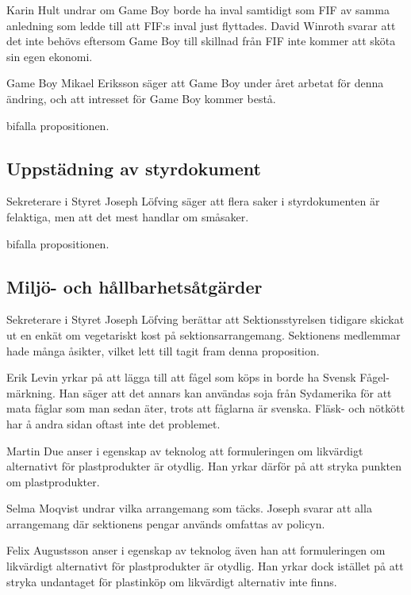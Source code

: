 \documentclass[hidelinks]{sektionsmote}
\begin{document}
Karin Hult undrar om Game Boy borde ha inval samtidigt som FIF av samma anledning som ledde till att FIF:s inval just flyttades.
David Winroth svarar att det inte behövs eftersom Game Boy till skillnad från FIF inte kommer att sköta sin egen ekonomi.

Game Boy Mikael Eriksson säger att Game Boy under året arbetat för denna ändring, och att intresset för Game Boy kommer bestå.

\begin{beslut}
  \item bifalla propositionen.
\end{beslut}


\subsection{Uppstädning av styrdokument}
Sekreterare i Styret Joseph Löfving säger att flera saker i styrdokumenten är felaktiga, men att det mest handlar om småsaker.

\begin{beslut}
  \item bifalla propositionen.
\end{beslut}


\subsection{Miljö- och hållbarhetsåtgärder}
Sekreterare i Styret Joseph Löfving berättar att Sektionsstyrelsen tidigare skickat ut en enkät om vegetariskt kost på sektionsarrangemang.
Sektionens medlemmar hade många åsikter, vilket lett till tagit fram denna proposition.

Erik Levin yrkar på att lägga till att fågel som köps in borde ha Svensk Fågel-märkning.
Han säger att det annars kan användas soja från Sydamerika för att mata fåglar som man sedan äter, trots att fåglarna är svenska.
Fläsk- och nötkött har å andra sidan oftast inte det problemet.

Martin Due anser i egenskap av teknolog att formuleringen om likvärdigt alternativt för plastprodukter är otydlig.
Han yrkar därför på att stryka punkten om plastprodukter.

Selma Moqvist undrar vilka arrangemang som täcks.
Joseph svarar att alla arrangemang där sektionens pengar används omfattas av policyn.

Felix Augustsson anser i egenskap av teknolog även han att formuleringen om likvärdigt alternativt för plastprodukter är otydlig.
Han yrkar dock istället på att stryka undantaget för plastinköp om likvärdigt alternativ inte finns.
\end{document}

